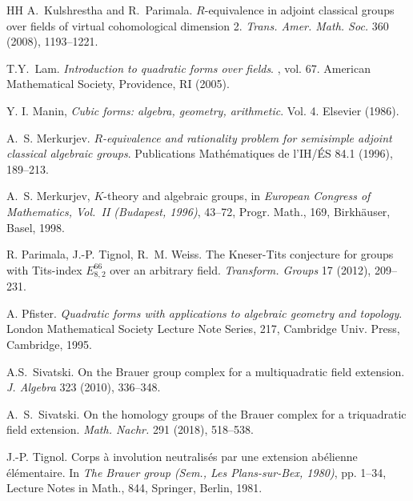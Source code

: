 \documentclass[twoside,11pt]{amsart}
\numberwithin{equation}{section}
\theoremstyle{definition}
\begin{document}
\begin{thebibliography}{HH}
A.~Kulshrestha and R.~Parimala.
$R$-equivalence in adjoint classical groups over fields
of virtual cohomological dimension 2.
\emph{Trans. Amer. Math. Soc.} 360 (2008), 1193--1221.

 T.Y.~Lam. \newblock \emph{Introduction to quadratic forms over fields}. , vol. 67. American Mathematical Society, Providence, RI (2005).

 Y. I. Manin, \emph{Cubic forms: algebra, geometry, arithmetic}. Vol. 4. Elsevier (1986).
    
 A.~S. Merkurjev. \emph{$R$-equivalence and rationality problem for semisimple adjoint classical algebraic groups}. Publications Math\'ematiques de  
	l'IH/\'ES 84.1 (1996), 189--213. 

A.~S. Merkurjev, $K$-theory and algebraic groups, in \emph{European Congress of Mathematics, Vol.\ II (Budapest, 1996)}, 43--72, Progr. Math., 169, Birkh\"auser, Basel, 1998. 
    
R. Parimala, J.-P. Tignol, R.~M. Weiss.
The Kneser-Tits conjecture for groups with Tits-index ${E}_{8,2}^{66}$ over an arbitrary field. \emph{Transform. Groups} 17 (2012), 209--231.

A. Pfister. \emph{Quadratic forms with applications to algebraic geometry and topology}. London Mathematical Society Lecture Note Series, 217, Cambridge Univ. Press, Cambridge, 1995.

A.S.~Sivatski.
On the Brauer group complex for a multiquadratic field extension. \emph{J. Algebra} 323 (2010), 336--348.

A.~S.~Sivatski. 
On the homology groups of the Brauer complex for a triquadratic field extension.
\emph{Math. Nachr.} 291 (2018), 518--538.

J.-P. Tignol. Corps \`a{} involution neutralis\'es par une extension ab\'elienne \'el\'ementaire. In {\it The Brauer group (Sem., Les Plans-sur-Bex, 1980)}, pp. 1--34, Lecture Notes in Math., 844, Springer, Berlin, 1981.

\end{thebibliography}
\end{document}
